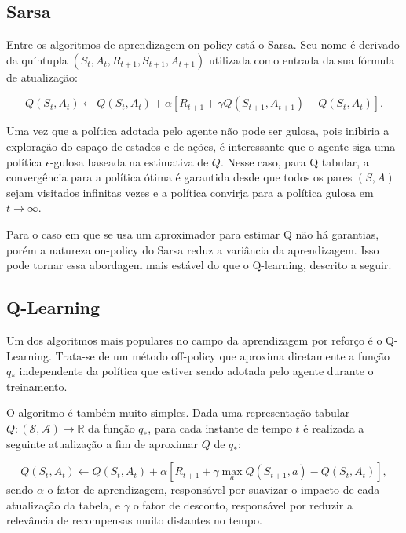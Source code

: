 \subsection{Sarsa}
\label{subsec:sarsa-theory}
Entre os algoritmos de aprendizagem on-policy está o Sarsa. Seu nome é derivado da quíntupla $(S_t, A_t, R_{t+1}, S_{t+1}, A_{t+1})$ utilizada como entrada da sua fórmula de atualização:

\begin{equation}
	\label{eq:sarsa}
	Q(S_t, A_t) \leftarrow Q(S_t, A_t) + \alpha[R_{t+1} + \gamma Q(S_{t+1}, A_{t+1}) - Q(S_t, A_t)].
\end{equation}

Uma vez que a política adotada pelo agente não pode ser gulosa, pois inibiria a exploração do espaço de estados e de ações, é interessante que o agente siga uma política $\epsilon$-gulosa baseada na estimativa de $Q$. Nesse caso, para Q tabular, a convergência para a política ótima é garantida desde que todos os pares $(S, A)$ sejam visitados infinitas vezes e a política convirja para a política gulosa em $t \to \infty$.

Para o caso em que se usa um aproximador para estimar Q não há garantias, porém a natureza on-policy do Sarsa reduz a variância da aprendizagem. Isso pode tornar essa abordagem mais estável do que o Q-learning, descrito a seguir.

\subsection{Q-Learning}
\label{subsec:q-theory}
Um dos algoritmos mais populares no campo da aprendizagem por reforço é o Q-Learning. Trata-se de um método off-policy que aproxima diretamente a função $q_*$ independente da política que estiver sendo adotada pelo agente durante o treinamento.

O algoritmo é também muito simples. Dada uma representação tabular $Q: (\mathcal{S},\mathcal{A}) \to \mathbb{R}$ da função $q_*$, para cada instante de tempo $t$ é realizada a seguinte atualização a fim de aproximar $Q$ de $q_*$:

\begin{equation}
Q(S_t, A_t) \leftarrow Q(S_t, A_t) + \alpha[R_{t+1} + \gamma\max_{a} Q(S_{t+1}, a) - Q(S_t, A_t)],
\end{equation}
% 
sendo $\alpha$ o fator de aprendizagem, responsável por suavizar o impacto de cada atualização da tabela, e $\gamma$ o fator de desconto, responsável por reduzir a relevância de recompensas muito distantes no tempo.

